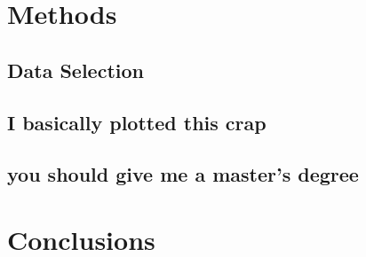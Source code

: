 \documentclass[11pt,letterpaper,draft,titlepage]{article}
\begin{document}
		
				
	\section{Methods}
		\subsection{Data Selection}
		\subsection{I basically plotted this crap}
		\subsection{you should give me a master's degree}
	
	\section{Conclusions}
	
	
	
\end{document}
